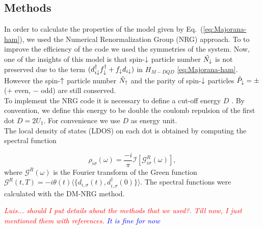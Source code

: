 \documentclass[showpacs,aps,prb,reprint,superscriptaddress]{revtex4-1}
\newcommand{\LUIS}[1]{\textcolor{blue}{\fbox{Luis} {\sl#1}}}
\newcommand{\Jesus}[1]{\textcolor{red}{\fbox{Jesus} {\sl#1}}}
\begin{document}
\subsection{Methods}
In order to calculate the properties of the model given by Eq.\ (\ref{eq:Majorana-ham}), we used the Numerical Renormalization Group (NRG) approach. \cite{wilson_renormalization_1975,sindel_numerical_2005,bulla_numerical_2008} 
 To to improve the efficiency of the code we used the symmetries of the system.  Now, one of the insights of this model is that spin-$\downarrow$ particle number $\hat{N_\downarrow}$ is not preserved due to the term $(d_{i\downarrow}^{\dagger}f^\dagger_{\downarrow} + 
f_{\downarrow}d_{i\downarrow})$ in $H_{M-DQD}$ \eqref{eq:Majorana-ham}. However the  spin-$\uparrow$ particle number $\hat{N}_\uparrow$ and the parity of spin-$\downarrow$ particles $\hat{P}_\downarrow = \pm $ ($+$ even, $-$ odd) are still conserved. \\

To implement the NRG code it is necessary to define a cut-off energy $D$ \cite{bulla_numerical_2008}. By convention, we define this energy to be double the coulomb repulsion of the first dot $D = 2U_1$. For convenience we use $D$ as energy unit.  \\


The local density of states (LDOS) on each dot is obtained by computing the spectral function 

\begin{equation}
    \rho_{i\sigma}(\omega)= \frac{-i}{\pi}\mathcal{I}\left[ \mathcal{G}^R_{i\sigma}(\omega) \right],
    \label{eq:SpectralFunction}
\end{equation}
%
where $\mathcal{G}^R(\omega)$ is the Fourier transform of the Green function $\mathcal{G}^R(t,T)=-i\theta(t) \langle \{d_{i,\sigma}(t) , d_{i,\sigma}^\dagger(0)\} \rangle$. The spectral functions were calculated with the DM-NRG method.\cite{hofstetter_generalized_2000} 



\Jesus{Luis... should I put details about the methods that we used?. Till now, I just mentioned them with references. }
\LUIS{It is fine for now}
\end{document}

